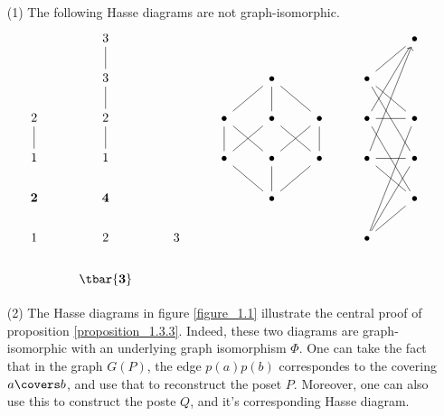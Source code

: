 \begin{example}\label{exmaple_1.8}
  \begin{enumerate}
    \item[(1)] The following Hasse diagrams are not graph-isomorphic.
      \[\begin{tikzcd}
  & 3 &&&&&& \bullet \\
  & 3 &&& \bullet && \bullet \\
        2 & 2 && \bullet & \bullet & \bullet & \bullet & \bullet \\
        1 & 1 && \bullet & \bullet & \bullet & \bullet & \bullet \\
        {\mathbf{2}} & {\mathbf{4}} &&& \bullet &&& \bullet \\
        1 & 2 & 3 &&&& \bullet \\
          & {\tbar{\mathbf{3}}}
          \arrow[no head, from=2-2, to=1-2]
          \arrow[no head, from=2-7, to=1-8]
          \arrow[no head, from=2-7, to=3-8]
          \arrow[no head, from=2-7, to=4-8]
          \arrow[no head, from=3-2, to=2-2]
          \arrow[no head, from=3-4, to=2-5]
          \arrow[no head, from=3-5, to=2-5]
          \arrow[no head, from=3-5, to=4-4]
          \arrow[no head, from=3-5, to=4-6]
          \arrow[no head, from=3-6, to=2-5]
          \arrow[no head, from=3-7, to=1-8]
          \arrow[no head, from=3-7, to=3-8]
          \arrow[no head, from=3-7, to=5-8]
          \arrow[no head, from=4-1, to=3-1]
          \arrow[no head, from=4-2, to=3-2]
          \arrow[no head, from=4-4, to=3-4]
          \arrow[no head, from=4-5, to=3-4]
          \arrow[no head, from=4-5, to=3-6]
          \arrow[no head, from=4-6, to=3-6]
          \arrow[from=4-7, to=1-8]
          \arrow[no head, from=4-7, to=4-8]
          \arrow[no head, from=4-7, to=5-8]
          \arrow[no head, from=5-5, to=4-4]
          \arrow[no head, from=5-5, to=4-5]
          \arrow[no head, from=5-5, to=4-6]
          \arrow[no head, from=6-7, to=3-8]
          \arrow[no head, from=6-7, to=4-8]
          \arrow[no head, from=6-7, to=5-8]
      \end{tikzcd}\]

    \item[(2)] The Hasse diagrams in figure \ref{figure_1.1}
      illustrate the central proof of proposition
      \ref{proposition_1.3.3}. Indeed, these two diagrams are
      graph-isomorphic with an underlying graph isomorphism $\Phi$.
      One can take the fact that in the graph $G(P)$, the edge
      $p(a)p(b)$ correspondes to the covering $a \covers b$, and use
      that to reconstruct the poset $P$. Moreover, one can also use
      this to construct the poste $Q$, and it's corresponding Hasse
      diagram.


\end{enumerate}
\end{example}
